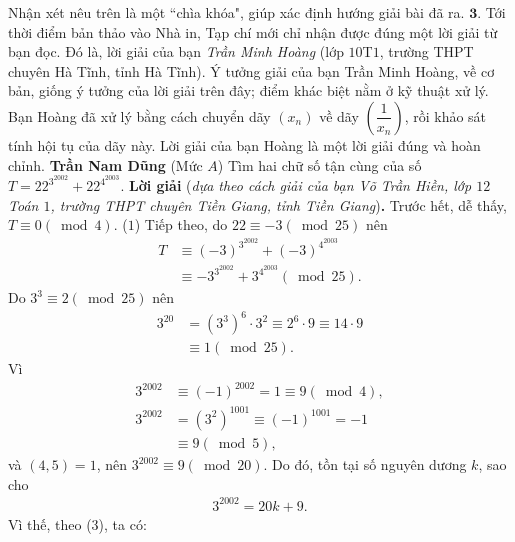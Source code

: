 \begin{multicols}{2}
	Nhận xét nêu trên là một ``chìa khóa", giúp xác định hướng giải bài đã ra.
	\vskip 0.05cm
	$\pmb{3.}$ Tới thời điểm bản thảo vào Nhà in, Tạp chí mới chỉ nhận được đúng một lời giải từ bạn đọc. Đó là, lời giải của bạn \textit{Trần Minh Hoàng} (lớp $10$T$1$, trường THPT chuyên Hà Tĩnh, tỉnh Hà Tĩnh). Ý tưởng giải của bạn Trần Minh Hoàng, về cơ bản, giống ý tưởng của lời giải trên đây; điểm khác biệt nằm ở kỹ thuật xử lý. Bạn Hoàng đã xử lý bằng cách chuyển dãy $(x_n)$  về dãy  $\left(\dfrac{1}{x_n}\right)$, rồi khảo sát tính hội tụ của dãy này. Lời giải của bạn Hoàng là một lời giải đúng và hoàn chỉnh.
	\vskip 0.05cm
	\hfill	\textbf{\color{thachthuctoanhoc}Trần Nam Dũng}
	\vskip 0.05cm
	{}
	(Mức $A$) Tìm hai chữ số tận cùng của số $T=22^{3^{2002}}+22^{4^{2003}}$.
	\vskip 0.05cm
	\textbf{\color{thachthuctoanhoc}Lời giải} (\textit{dựa theo cách giải của bạn Võ Trần Hiền, lớp $12$ Toán $1$, trường THPT chuyên Tiền Giang, tỉnh Tiền Giang})\textbf{\color{thachthuctoanhoc}.}
	\vskip 0.05cm
	Trước hết, dễ thấy, $T \equiv 0\left( {\bmod 4} \right)$. \hfill ($1$)
	\vskip 0.05cm
	Tiếp theo, do  $22 \equiv  - 3\left( {\bmod 25} \right)$ nên
	\begin{align*}
		T &\equiv {\left( { - 3} \right)^{{3^{2002}}}} + {\left( { - 3} \right)^{{4^{2003}}}} \\
		&\equiv  - {3^{{3^{2002}}}} + {3^{{4^{2003}}}}\left( {\bmod 25} \right). \tag{$2$}
	\end{align*}
	Do  ${3^3} \equiv 2\left( {\bmod 25} \right)$ nên
	\begin{align*}
		{3^{20}} &= {\left( {{3^3}} \right)^6} \cdot {3^2} \equiv {2^6} \cdot 9 \equiv 14 \cdot 9 \\
		&\equiv 1\left( {\bmod 25} \right). \tag{$3$}
	\end{align*}
	Vì
	\begin{align*}
		{3^{2002}} &\equiv {\left( { - 1} \right)^{2002}} = 1 \equiv 9\left( {\bmod 4} \right),\\
		{3^{2002}} &= {\left( {{3^2}} \right)^{1001}} \equiv {\left( { - 1} \right)^{1001}} =  - 1 \\
		&\equiv 9\left( {\bmod 5} \right),
	\end{align*}
	và $(4, 5) = 1$, nên ${3^{2002}} \equiv 9\left( {\bmod 20} \right)$.  Do đó, tồn tại số nguyên dương $k$, sao cho
	\begin{align*}
		{3^{2002}} = 20k + 9.
	\end{align*}
	Vì thế, theo ($3$), ta có:
	\begin{align*}

\end{align*}
\end{multicols}
